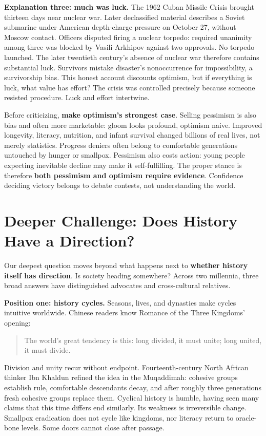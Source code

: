 \textbf{Explanation three: much was luck.} The 1962 Cuban Missile Crisis brought thirteen days near nuclear war. Later declassified material describes a Soviet submarine under American depth-charge pressure on October 27, without Moscow contact. Officers disputed firing a nuclear torpedo: required unanimity among three was blocked by Vasili Arkhipov against two approvals. No torpedo launched. The later twentieth century's absence of nuclear war therefore contains substantial luck. Survivors mistake disaster's nonoccurrence for impossibility, a survivorship bias. This honest account discounts optimism, but if everything is luck, what value has effort? The crisis was controlled precisely because someone resisted procedure. Luck and effort intertwine.

Before criticizing, \textbf{make optimism's strongest case}. Selling pessimism is also bias and often more marketable: gloom looks profound, optimism naive. Improved longevity, literacy, nutrition, and infant survival changed billions of real lives, not merely statistics. Progress deniers often belong to comfortable generations untouched by hunger or smallpox. Pessimism also costs action: young people expecting inevitable decline may make it self-fulfilling. The proper stance is therefore \textbf{both pessimism and optimism require evidence}. Confidence deciding victory belongs to debate contests, not understanding the world.

\section[Does History Have a Direction?]{Deeper Challenge: Does History Have a Direction?}
Our deepest question moves beyond what happens next to \textbf{whether history itself has direction}. Is society heading somewhere? Across two millennia, three broad answers have distinguished advocates and cross-cultural relatives.

\textbf{Position one: history cycles.} Seasons, lives, and dynasties make cycles intuitive worldwide. Chinese readers know Romance of the Three Kingdoms' opening:

\begin{quote}
The world's great tendency is this: long divided, it must unite; long united, it must divide.
\end{quote}
Division and unity recur without endpoint. Fourteenth-century North African thinker Ibn Khaldun refined the idea in the Muqaddimah: cohesive groups establish rule, comfortable descendants decay, and after roughly three generations fresh cohesive groups replace them. Cyclical history is humble, having seen many claims that this time differs end similarly. Its weakness is irreversible change. Smallpox eradication does not cycle like kingdoms, nor literacy return to oracle-bone levels. Some doors cannot close after passage.

